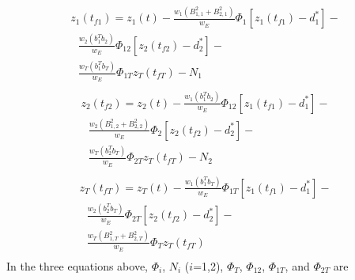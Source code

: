 \begin{equation}
\label{eq:31}
\begin{gathered}
  {z_1}({t_{f1}}) = {z_1}(t) - \frac{{{w_1}(B_{1,1}^2 + B_{2,1}^2)}}{{{w_E}}}{\Phi _1}\left[ {{z_1}({t_{f1}}) - d_1^*} \right] -  \\ 
  {\text{ }}\frac{{{w_2}\left( {b_1^T{b_2}} \right)}}{{{w_E}}}{\Phi _{12}}\left[ {{z_2}({t_{f2}}) - d_2^*} \right] -  \\ 
  {\text{ }}\frac{{{w_T}\left( {b_1^T{b_T}} \right)}}{{{w_E}}}{\Phi _{1T}}{z_T}({t_{fT}}) - {N_1} \\ 
\end{gathered}
\end{equation}
\begin{equation}
\label{eq:32}
\begin{gathered}
  {z_2}({t_{f2}}) = {z_2}(t) - \frac{{{w_1}\left( {b_1^T{b_2}} \right)}}{{{w_E}}}{\Phi _{12}}\left[ {{z_1}({t_{f1}}) - d_1^*} \right] -  \\ 
  {\text{ }}\frac{{{w_2}(B_{1,2}^2 + B_{2,2}^2)}}{{{w_E}}}{\Phi _2}\left[ {{z_2}({t_{f2}}) - d_2^*} \right] -  \\ 
  {\text{ }}\frac{{{w_T}\left( {b_2^T{b_T}} \right)}}{{{w_E}}}{\Phi _{2T}}{z_T}({t_{fT}}) - {N_2} \\ 
\end{gathered}
\end{equation}
\begin{equation}
\label{eq:33}
\begin{gathered}
  {z_T}({t_{fT}}) = {z_T}(t) - \frac{{{w_1}\left( {b_1^T{b_T}} \right)}}{{{w_E}}}{\Phi _{1T}}\left[ {{z_1}({t_{f1}}) - d_1^*} \right] -  \\ 
  {\text{ }}\frac{{{w_2}\left( {b_2^T{b_T}} \right)}}{{{w_E}}}{\Phi _{2T}}\left[ {{z_2}({t_{f2}}) - d_2^*} \right] -  \\ 
  {\text{ }}\frac{{{w_T}\left( {B_{1,T}^2 + B_{2,T}^2} \right)}}{{{w_E}}}{\Phi _T}{z_T}({t_{fT}}) \\ 
\end{gathered}
\end{equation}
In the three equations above, ${\Phi _i}$, ${N_i}$ ($i$=1,2), ${\Phi _T}$, ${\Phi _{12}}$, ${\Phi _{1T}}$, and ${\Phi _{2T}}$ are

